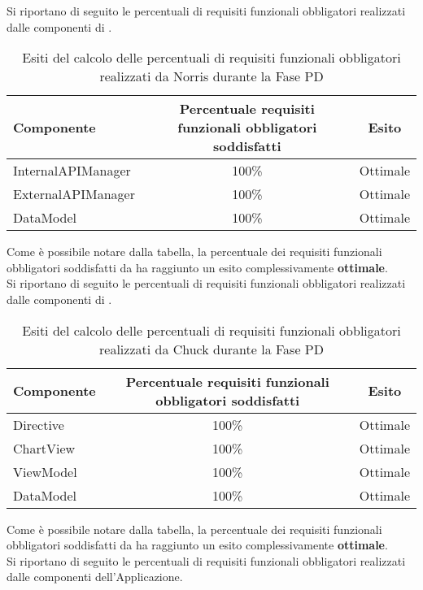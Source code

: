 					Si riportano di seguito le percentuali di requisiti funzionali obbligatori realizzati dalle componenti di .
					\begin{table}[H]
						\centering
							\begin{tabu}{| l | c | c |}
								\hline
								Componente	& Percentuale requisiti funzionali obbligatori soddisfatti	& Esito		\\ \hline \hline
								InternalAPIManager	& 100\% 	& Ottimale  \\ \hline
								ExternalAPIManager  & 	100\%	& Ottimale  \\ \hline
								DataModel  & 	100\%	& Ottimale  \\ \hline
							\end{tabu}
						\caption{Esiti del calcolo delle percentuali di requisiti funzionali obbligatori realizzati da Norris durante la Fase PD}
					\end{table}
					Come è possibile notare dalla tabella, la percentuale dei requisiti funzionali obbligatori soddisfatti da  ha raggiunto un esito complessivamente \textbf{ottimale}.\\
					Si riportano di seguito le percentuali di requisiti funzionali obbligatori realizzati dalle componenti di \insglo{Chuck}.
					\begin{table}[H]
						\centering
							\begin{tabu}{| l | c | c |}
								\hline
								Componente	& Percentuale requisiti funzionali obbligatori soddisfatti	& Esito		\\ \hline \hline
								Directive  &	100\% 	& Ottimale  \\ \hline
								ChartView  & 	100\%	& Ottimale  \\ \hline
								ViewModel  & 	100\%	& Ottimale  \\ \hline
								DataModel  & 	100\%	& Ottimale  \\ \hline
							\end{tabu}
						\caption{Esiti del calcolo delle percentuali di requisiti funzionali obbligatori realizzati da Chuck durante la Fase PD}
					\end{table}
					Come è possibile notare dalla tabella, la percentuale dei requisiti funzionali obbligatori soddisfatti da  ha raggiunto un esito complessivamente \textbf{ottimale}.\\
					Si riportano di seguito le percentuali di requisiti funzionali obbligatori realizzati dalle componenti dell'Applicazione.
